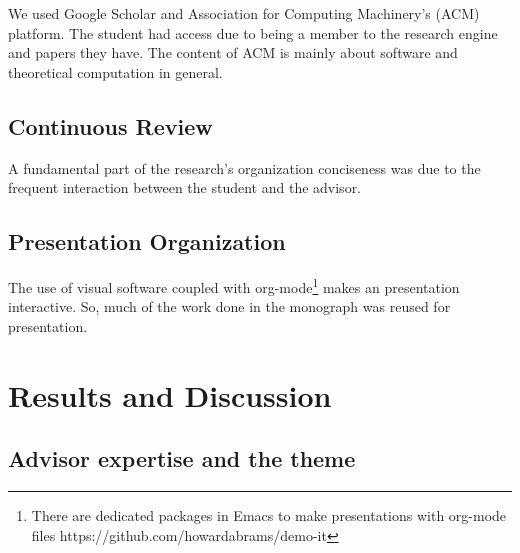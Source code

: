 \documentclass[
12pt,				%
openright,			%
oneside,			%
a4paper,			%
brazil,				%
english,			%
]{abntex2}
\begin{document}
We used Google Scholar and Association for Computing Machinery's (ACM)
platform. The student had access due to being a member to the research
engine and papers they have. The content of ACM is mainly about
software and theoretical computation in general. 

\section{Continuous Review}
A fundamental part of the research's organization conciseness was due
to the frequent interaction between the student and the advisor.

\section{Presentation Organization}
The use of visual software coupled with org-mode\footnote{There are
  dedicated packages in Emacs to make presentations with org-mode
  files https://github.com/howardabrams/demo-it} makes an presentation
interactive. So, much of the work done in the monograph was reused for presentation.

\chapter{Results and Discussion}

\section{Advisor expertise and the theme}
\end{document}
